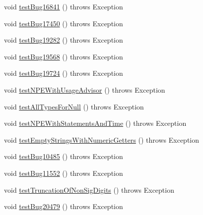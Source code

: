 \begin{DoxyCompactItemize}
\item 
void \mbox{\hyperlink{classtestsuite_1_1regression_1_1_result_set_regression_test_ad9be7ab34170c6249e0de5467279a59c}{test\+Bug16841}} ()  throws Exception 
\item 
void \mbox{\hyperlink{classtestsuite_1_1regression_1_1_result_set_regression_test_a3f4bf90b85397d484d4ca1e59e7700da}{test\+Bug17450}} ()  throws Exception 
\item 
void \mbox{\hyperlink{classtestsuite_1_1regression_1_1_result_set_regression_test_ace41da4e4b41051800b1bb47347f5f5a}{test\+Bug19282}} ()  throws Exception 
\item 
void \mbox{\hyperlink{classtestsuite_1_1regression_1_1_result_set_regression_test_a243245419ea16f2581deffc7fd1bf796}{test\+Bug19568}} ()  throws Exception 
\item 
void \mbox{\hyperlink{classtestsuite_1_1regression_1_1_result_set_regression_test_a6e94637bdaa705a841b6250c5a1c74e3}{test\+Bug19724}} ()  throws Exception 
\item 
void \mbox{\hyperlink{classtestsuite_1_1regression_1_1_result_set_regression_test_a9c88eb5f40272dcb6a8893c7974954b6}{test\+N\+P\+E\+With\+Usage\+Advisor}} ()  throws Exception 
\item 
void \mbox{\hyperlink{classtestsuite_1_1regression_1_1_result_set_regression_test_ad2bea8a1f2ee52e4d670b2f5231f4658}{test\+All\+Types\+For\+Null}} ()  throws Exception 
\item 
void \mbox{\hyperlink{classtestsuite_1_1regression_1_1_result_set_regression_test_a9704114e8c4af7e53ecb784c74630535}{test\+N\+P\+E\+With\+Statements\+And\+Time}} ()  throws Exception 
\item 
void \mbox{\hyperlink{classtestsuite_1_1regression_1_1_result_set_regression_test_aa09d2e6b4a7cfb44ec027cacfd75c65e}{test\+Empty\+Strings\+With\+Numeric\+Getters}} ()  throws Exception 
\item 
void \mbox{\hyperlink{classtestsuite_1_1regression_1_1_result_set_regression_test_a636970914398d594bf3bb15b35d2388e}{test\+Bug10485}} ()  throws Exception 
\item 
void \mbox{\hyperlink{classtestsuite_1_1regression_1_1_result_set_regression_test_a51f2936ac4b4712e95e6a70490704482}{test\+Bug11552}} ()  throws Exception 
\item 
void \mbox{\hyperlink{classtestsuite_1_1regression_1_1_result_set_regression_test_ab795cff973063bdb983542cffb1c54cd}{test\+Truncation\+Of\+Non\+Sig\+Digits}} ()  throws Exception 
\item 
void \mbox{\hyperlink{classtestsuite_1_1regression_1_1_result_set_regression_test_ac51afa90e507daec20c3fe37a132b0de}{test\+Bug20479}} ()  throws Exception 

\end{DoxyCompactItemize}
